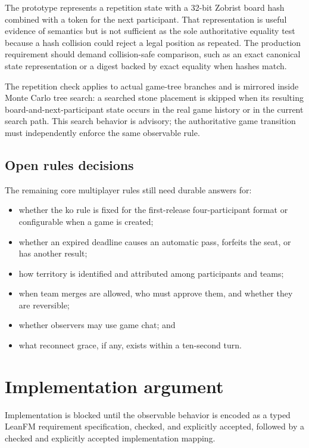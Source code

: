 \documentclass[11pt,oneside]{book}
\begin{document}
The prototype represents a repetition state with a 32-bit Zobrist board hash combined with a token for the next participant. That representation is useful evidence of semantics but is not sufficient as the sole authoritative equality test because a hash collision could reject a legal position as repeated. The production requirement should demand collision-safe comparison, such as an exact canonical state representation or a digest backed by exact equality when hashes match.

The repetition check applies to actual game-tree branches and is mirrored inside Monte Carlo tree search: a searched stone placement is skipped when its resulting board-and-next-participant state occurs in the real game history or in the current search path. This search behavior is advisory; the authoritative game transition must independently enforce the same observable rule.

\section{Open rules decisions}
The remaining core multiplayer rules still need durable answers for:
\begin{itemize}
  \item whether the ko rule is fixed for the first-release four-participant format or configurable when a game is created;
  \item whether an expired deadline causes an automatic pass, forfeits the seat, or has another result;
  \item how territory is identified and attributed among participants and teams;
  \item when team merges are allowed, who must approve them, and whether they are reversible;
  \item whether observers may use game chat; and
  \item what reconnect grace, if any, exists within a ten-second turn.
\end{itemize}

\chapter{Implementation argument}
Implementation is blocked until the observable behavior is encoded as a typed LeanFM requirement specification, checked, and explicitly accepted, followed by a checked and explicitly accepted implementation mapping.
\end{document}
